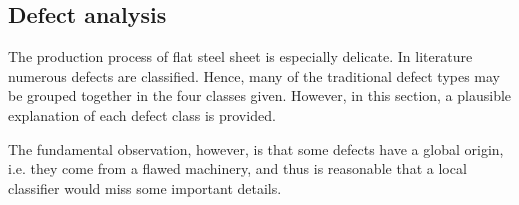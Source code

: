     \subsection{Defect analysis}\label{subsection:defects}
        \par{
            The production process of flat steel sheet is especially delicate. In literature \cite{defects:64common,defects:mainlinemetals} numerous defects are classified. Hence, many of the traditional defect types may be grouped together in the four classes given. However, in this section, a plausible explanation of each defect class is provided.
        }
        \par{
            The fundamental observation, however, is that some defects have a global origin, i.e. they come from a flawed machinery, and thus is reasonable that a local classifier would miss some important details.
        }
